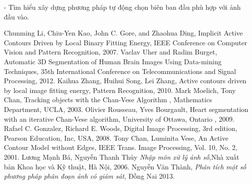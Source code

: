 \documentclass[14pt,oneside,a4paper]{extreport}
\begin{document}
- Tìm hiểu xây dựng phương pháp tự động chọn biên ban đầu phù hợp với ảnh đầu vào.
\newpage
\begin{thebibliography}{7}
Chunming Li, Chiu-Yen Kao, John C. Gore, and Zhaohua Ding, Implicit Active Contours Driven by Local Binary Fitting Energy,  IEEE Conference on Computer Vision and Pattern Recognition, 2007.
Vaclav Uher and Radim Burget, Automatic 3D Segmentation of Human Brain
Images Using Data-mining Techniques, 35th International Conference on Telecommunications and Signal Processing, 2012.
Kaihua Zhang, Huihui Song, Lei Zhang, Active contours driven by local image fitting energy, Pattern Recognition, 2010.
Mark Moelich, Tony Chan, Tracking objects with the Chan-Vese Algorithm , Mathematics Department, UCLA, 2003.
Olivier Rousseau, Yves Bourgault,  Heart segmentation with an iterative Chan-Vese
algorithm, University of Ottawa, Ontario , 2009.
Rafael C. Gonzalez, Richard E. Woods,  Digital Image Processing, 3rd edition, Pearson Education, Inc, USA, 2008.
Tony Chan, Luminita Vese, An Active Contour Model without Edges, IEEE Trans. Image
Processing, Vol. 10, No. 2,  2001.
Lương Mạnh Bá, Nguyễn Thanh Thủy \textsl{Nhập môn xử lý ảnh số},Nhà xuất bản Khoa học và Kỹ thuật, Hà Nội, 2006.
Nguyễn Văn Thành, \textsl{Phân tích một số phương pháp phân đoạn ảnh có giám sát}, Đồng Nai 2013.

\end{thebibliography}
\thispagestyle{empty}
\end{document}
